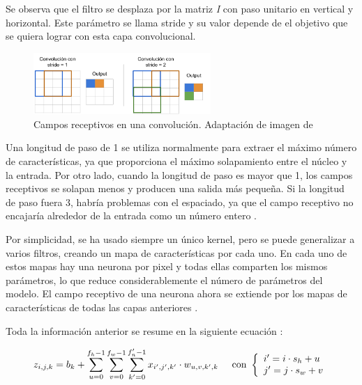 Se observa que el filtro se desplaza por la matriz \textit{I} con paso unitario en vertical y horizontal. Este parámetro se llama stride y su valor depende de el objetivo que se quiera lograr con esta capa convolucional.

\begin{figure}[h]
    \centering
    \includegraphics[width=0.6\textwidth]{img/stride.png}
    \caption{Campos receptivos en una convolución. Adaptación de imagen de \citep{yepez2020stride}}
    \label{fig:receptive_field}
\end{figure}

Una longitud de paso de 1 se utiliza normalmente para extraer el máximo número de características, ya que proporciona el máximo solapamiento entre el núcleo y la entrada. Por otro lado, cuando la longitud de paso es mayor que 1, los campos receptivos se solapan menos y producen una salida más pequeña. Si la longitud de paso fuera 3, habría problemas con el espaciado, ya que el campo receptivo no encajaría alrededor de la entrada como un número entero \citep{yepez2020stride}.



Por simplicidad, se ha usado siempre un único kernel, pero se puede generalizar a varios filtros, creando un mapa de características por cada uno. En cada uno de estos mapas hay una neurona por pixel y todas ellas comparten los mismos parámetros, lo que reduce considerablemente el número de parámetros del modelo. El campo receptivo de una neurona ahora se extiende por los mapas de características de todas las capas anteriores \citep{geron2022hands}.



Toda la información anterior se resume en la siguiente ecuación \citep{pajares2021aprendizaje}:

\begin{equation}
z_{i,j,k} = b_k + \sum_{u=0}^{f_h-1} \sum_{v=0}^{f_w-1} \sum_{k'=0}^{f_n'-1} x_{i',j',k'} \cdot w_{u,v,k',k} \hspace{5mm} \textup{con }
\left\{
\begin{array}{l}
i' = i \cdot s_h + u \\
j' = j \cdot s_w + v
\end{array}
\right.
\end{equation}

